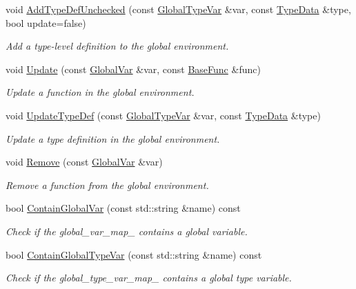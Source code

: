 \begin{DoxyCompactItemize}
void \hyperlink{classtvm_1_1IRModuleNode_a1c4aaf62ebed8952d523c3e832051299}{Add\+Type\+Def\+Unchecked} (const \hyperlink{classtvm_1_1GlobalTypeVar}{Global\+Type\+Var} \&var, const \hyperlink{classtvm_1_1TypeData}{Type\+Data} \&type, bool update=false)
\begin{DoxyCompactList}\small\item\em Add a type-\/level definition to the global environment. \end{DoxyCompactList}\item 
void \hyperlink{classtvm_1_1IRModuleNode_abdd8936c6fca33ef9b7c086f8fd58f84}{Update} (const \hyperlink{classtvm_1_1GlobalVar}{Global\+Var} \&var, const \hyperlink{classtvm_1_1BaseFunc}{Base\+Func} \&func)
\begin{DoxyCompactList}\small\item\em Update a function in the global environment. \end{DoxyCompactList}\item 
void \hyperlink{classtvm_1_1IRModuleNode_a63b73181faaa31a95e8d71e1cf5b80b2}{Update\+Type\+Def} (const \hyperlink{classtvm_1_1GlobalTypeVar}{Global\+Type\+Var} \&var, const \hyperlink{classtvm_1_1TypeData}{Type\+Data} \&type)
\begin{DoxyCompactList}\small\item\em Update a type definition in the global environment. \end{DoxyCompactList}\item 
void \hyperlink{classtvm_1_1IRModuleNode_a1350c7d68665605f9c4f10850f4a90b9}{Remove} (const \hyperlink{classtvm_1_1GlobalVar}{Global\+Var} \&var)
\begin{DoxyCompactList}\small\item\em Remove a function from the global environment. \end{DoxyCompactList}\item 
bool \hyperlink{classtvm_1_1IRModuleNode_a8614291d65bba50bbdc4c30053d96790}{Contain\+Global\+Var} (const std\+::string \&name) const 
\begin{DoxyCompactList}\small\item\em Check if the global\+\_\+var\+\_\+map\+\_\+ contains a global variable. \end{DoxyCompactList}\item 
bool \hyperlink{classtvm_1_1IRModuleNode_ab9cee2139cc9ece5fed5ddb949a72f4b}{Contain\+Global\+Type\+Var} (const std\+::string \&name) const 
\begin{DoxyCompactList}\small\item\em Check if the global\+\_\+type\+\_\+var\+\_\+map\+\_\+ contains a global type variable. \end{DoxyCompactList}\item 

\end{DoxyCompactItemize}
